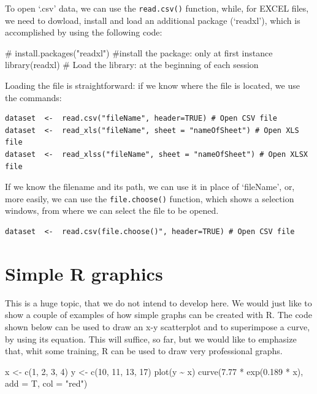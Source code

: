 \documentclass[a4paper,12pt,oneside]{book}
\newenvironment{Shaded}{\begin{snugshade}}{\end{snugshade}}
\newcommand{\DecValTok}[1]{#1}
\newcommand{\FloatTok}[1]{#1}
\newcommand{\SpecialCharTok}[1]{#1}
\newcommand{\StringTok}[1]{#1}
\newcommand{\CommentTok}[1]{#1}
\newcommand{\OtherTok}[1]{#1}
\newcommand{\FunctionTok}[1]{#1}
\newcommand{\AttributeTok}[1]{#1}
\newcommand{\NormalTok}[1]{#1}
\begin{document}
To open `.csv' data, we can use the \texttt{read.csv()} function, while, for EXCEL files, we need to dowload, install and load an additional package (`readxl'), which is accomplished by using the following code:

\begin{Shaded}
\begin{Highlighting}[]
\CommentTok{\# install.packages("readxl") \#install the package: only at first instance}
\FunctionTok{library}\NormalTok{(readxl) }\CommentTok{\# Load the library: at the beginning of each session}
\end{Highlighting}
\end{Shaded}

Loading the file is straightforward: if we know where the file is located, we use the commands:

\begin{verbatim}
dataset  <-  read.csv("fileName", header=TRUE) # Open CSV file
dataset  <-  read_xls("fileName", sheet = "nameOfSheet") # Open XLS file
dataset  <-  read_xlss("fileName", sheet = "nameOfSheet") # Open XLSX file
\end{verbatim}

If we know the filename and its path, we can use it in place of `fileName', or, more easily, we can use the \texttt{file.choose()} function, which shows a selection windows, from where we can select the file to be opened.

\begin{verbatim}
dataset  <-  read.csv(file.choose()", header=TRUE) # Open CSV file
\end{verbatim}

\hypertarget{simple-r-graphics}{%
\section{Simple R graphics}\label{simple-r-graphics}}

This is a huge topic, that we do not intend to develop here. We would just like to show a couple of examples of how simple graphs can be created with R. The code shown below can be used to draw an x-y scatterplot and to superimpose a curve, by using its equation. This will suffice, so far, but we would like to emphasize that, whit some training, R can be used to draw very professional graphs.

\begin{Shaded}
\begin{Highlighting}[]
\NormalTok{x  }\OtherTok{\textless{}{-}}  \FunctionTok{c}\NormalTok{(}\DecValTok{1}\NormalTok{, }\DecValTok{2}\NormalTok{, }\DecValTok{3}\NormalTok{, }\DecValTok{4}\NormalTok{)}
\NormalTok{y  }\OtherTok{\textless{}{-}}  \FunctionTok{c}\NormalTok{(}\DecValTok{10}\NormalTok{, }\DecValTok{11}\NormalTok{, }\DecValTok{13}\NormalTok{, }\DecValTok{17}\NormalTok{)}
\FunctionTok{plot}\NormalTok{(y }\SpecialCharTok{\textasciitilde{}}\NormalTok{ x)}
\FunctionTok{curve}\NormalTok{(}\FloatTok{7.77} \SpecialCharTok{*} \FunctionTok{exp}\NormalTok{(}\FloatTok{0.189} \SpecialCharTok{*}\NormalTok{ x), }\AttributeTok{add =}\NormalTok{ T, }\AttributeTok{col =} \StringTok{"red"}\NormalTok{)}
\end{Highlighting}
\end{Shaded}
\end{document}
